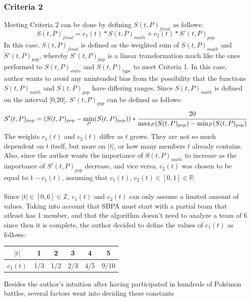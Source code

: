 \documentclass{article}
\begin{document}
\subsubsection{Criteria 2}
Meeting Criteria 2 can be done by defining $S(t,P)_{final}$ as follows:
\begin{equation*}
	S(t,P)_{final}=c_1(t)*S(t,P)_{math}+c_2(t)*S'(t,P)_{pop}
\end{equation*}
In this case, $S(t,P)_{final}$ is defined as the weighted sum of $S(t,P)_{math}$ and $S'(t,P)_{pop}$, whereby $S'(t,P)_{pop}$ is a linear transformation much like the ones performed to $S(t,P)_{stats}$ and $S(t,P)_{type}$ to meet Criteria 1. In this case, author wants to avoid any unintended bias from the possibility that the functions $S(t,P)_{math}$ and $S(t,P)_{pop}$ have differing ranges. Since $S(t,P)_{math}$ is defined on the interval [0,20], $S'(t,P)_{pop}$ can be defined as follows:
\begin{equation*}
	S'(t,P)_{pop}=(S(t,P)_{pop}-\min_P(S(t,P)_{pop}))*\cfrac{20}{\max_P(S(t,P)_{pop})-\min_P(S(t,P)_{pop})}
\end{equation*}
The weights $c_1(t)$ and $c_2(t)$ differ as $t$ grows. They are not so much dependent on $t$ itself, but more on $|t|$, or how many members $t$ already contains. Also, since the author wants the importance of $S(t,P)_{math}$ to increase as the importance of $S'(t,P)_{pop}$ decrease, and vice versa, $c_2(t)$ was chosen to be equal to $1-c_1(t)$, assuming that $c_1(t)\text{, }c_2(t)\in[0,1]\in\mathbb{R}$.\\\\
Since $|t|\in [0,6]\in\mathbb{Z}$, $c_1(t)$ and $c_2(t)$ can only assume a limited amount of values. Taking into account that SBPA must start with a partial team that atleast has 1 member, and that the algorithm doesn't need to analyze a team of 6 since then it is complete, the author decided to define the values of $c_1(t)$ as follows:
\begin{center}
	\begin{tabular}{c||c|c|c|c|c}
		$|t|$&1&2&3&4&5\\
		\hline
		$c_1(t)$&1/3&1/2&2/3&4/5&9/10
	\end{tabular}
\end{center}
Besides the author's intuition after having participated in hundreds of Pok\'emon battles, several factors went into deciding these constants
\end{document}

